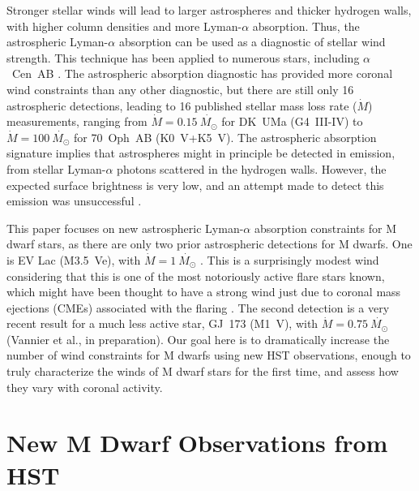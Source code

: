 \documentclass[preprint]{aastex}
\begin{document}
     Stronger stellar winds will lead to larger astrospheres and thicker
hydrogen walls, with higher column densities and more Lyman-$\alpha$
absorption.  Thus, the astrospheric Lyman-$\alpha$ absorption can be
used as a diagnostic of stellar wind strength.  This technique has
been applied to numerous stars, including $\alpha$~Cen~AB
\citep{bew01,bew05a,bew05b,bew14,bew18}.
The astrospheric absorption diagnostic has provided more
coronal wind constraints than any other diagnostic, but there are still
only 16 astrospheric detections, leading to 16 published stellar mass
loss rate ($\dot{M}$) measurements, ranging from
$\dot{M}=0.15~\dot{M_{\odot}}$ for DK~UMa (G4~III-IV) to
$\dot{M}=100~\dot{M_{\odot}}$ for 70~Oph~AB (K0~V+K5~V).  The
astrospheric absorption signature implies that astrospheres might
in principle be detected in emission, from stellar Lyman-$\alpha$
photons scattered in the hydrogen walls.  However, the expected surface
brightness is very low, and an attempt made to detect this emission
was unsuccessful \citep{bew03}.

     This paper focuses on new astrospheric Lyman-$\alpha$ absorption
constraints for M dwarf stars, as there are only two prior astrospheric
detections for M dwarfs.  One is EV Lac (M3.5~Ve), with
$\dot{M}=1~\dot{M_{\odot}}$ \citep{bew05a}.  This is
a surprisingly modest wind considering that this is one of the most
notoriously active flare stars known, which might have been thought
to have a strong wind just due to coronal mass ejections (CMEs) associated
with the flaring \citep{jjd13}.  The second detection is
a very recent result for a much less active star, GJ~173 (M1~V), with
$\dot{M}=0.75~\dot{M_{\odot}}$ (Vannier et al., in preparation).  Our goal here
is to dramatically increase the number of wind constraints for M dwarfs
using new HST observations, enough to truly characterize the
winds of M dwarf stars for the first time, and assess how they vary
with coronal activity.

\section{New M Dwarf Observations from HST}
\end{document}
